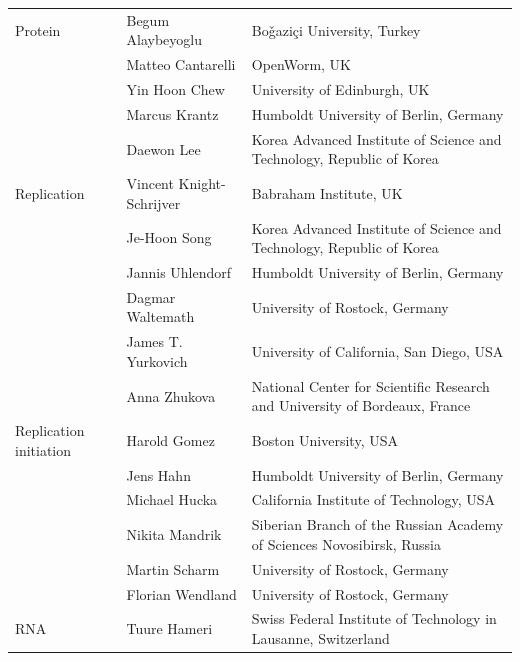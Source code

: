 \documentclass[journal,transmag]{IEEEtran}
\begin{document}
\begin{table}[ht!]
\begin{tabularx}{\textwidth}{l||l||X}
Protein                   & Begum Alaybeyoglu                & Bo\v{g}azi\c{c}i University, Turkey\\
                          & Matteo Cantarelli                & OpenWorm, UK\\
                          & Yin Hoon Chew                    & University of Edinburgh, UK\\
                          & Marcus Krantz                    & Humboldt University of Berlin, Germany\\
                          & Daewon Lee                       & Korea Advanced Institute of Science and Technology, Republic of Korea\\\hline
Replication               & Vincent Knight-Schrijver         & Babraham Institute, UK\\
                          & Je-Hoon Song                     & Korea Advanced Institute of Science and Technology, Republic of Korea\\
                          & Jannis Uhlendorf                 & Humboldt University of Berlin, Germany\\
                          & Dagmar Waltemath                 & University of Rostock, Germany\\
                          & James T. Yurkovich                  & University of California, San Diego, USA\\
                          & Anna Zhukova                     & National Center for Scientific Research and University of Bordeaux, France\\\hline
Replication initiation    & Harold Gomez                     & Boston University, USA\\
                          & Jens Hahn                        & Humboldt University of Berlin, Germany\\
                          & Michael Hucka                    & California Institute of Technology, USA\\
                          & Nikita Mandrik                   & Siberian Branch of the Russian Academy of Sciences Novosibirsk, Russia\\
                          & Martin Scharm                    & University of Rostock, Germany\\
                          & Florian Wendland                 & University of Rostock, Germany\\\hline
RNA                       & Tuure Hameri                     & Swiss Federal Institute of Technology in Lausanne, Switzerland\\

\end{tabularx}
\end{table}
\end{document}
